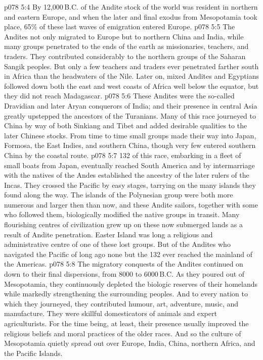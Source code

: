 \vs p078 5:4 \pc By 12,000\,B.C.  of the Andite stock of the world was resident in northern and eastern Europe, and when the later and final exodus from Mesopotamia took place, 65\% of these last waves of emigration entered Europe.
\vs p078 5:5 \pc The Andites not only migrated to Europe but to northern China and India, while many groups penetrated to the ends of the earth as missionaries, teachers, and traders. They contributed considerably to the northern groups of the Saharan Sangik peoples. But only a few teachers and traders ever penetrated farther south in Africa than the headwaters of the Nile. Later on, mixed Andites and Egyptians followed down both the east and west coasts of Africa well below the equator, but they did not reach Madagascar.
\vs p078 5:6 These Andites were the so\hyp{}called Dravidian and later Aryan conquerors of India; and their presence in central Asia greatly upstepped the ancestors of the Turanians. Many of this race journeyed to China by way of both Sinkiang and Tibet and added desirable qualities to the later Chinese stocks. From time to time small groups made their way into Japan, Formosa, the East Indies, and southern China, though very few entered southern China by the coastal route.
\vs p078 5:7 132 of this race, embarking in a fleet of small boats from Japan, eventually reached South America and by intermarriage with the natives of the Andes established the ancestry of the later rulers of the Incas. They crossed the Pacific by easy stages, tarrying on the many islands they found along the way. The islands of the Polynesian group were both more numerous and larger then than now, and these Andite sailors, together with some who followed them, biologically modified the native groups in transit. Many flourishing centres of civilization grew up on these now submerged lands as a result of Andite penetration. Easter Island was long a religious and administrative centre of one of these lost groups. But of the Andites who navigated the Pacific of long ago none but the 132 ever reached the mainland of the Americas.
\vs p078 5:8 \pc The migratory conquests of the Andites continued on down to their final dispersions, from 8000 to 6000\,B.C. As they poured out of Mesopotamia, they continuously depleted the biologic reserves of their homelands while markedly strengthening the surrounding peoples. And to every nation to which they journeyed, they contributed humour, art, adventure, music, and manufacture. They were skillful domesticators of animals and expert agriculturists. For the time being, at least, their presence usually improved the religious beliefs and moral practices of the older races. And so the culture of Mesopotamia quietly spread out over Europe, India, China, northern Africa, and the Pacific Islands.
